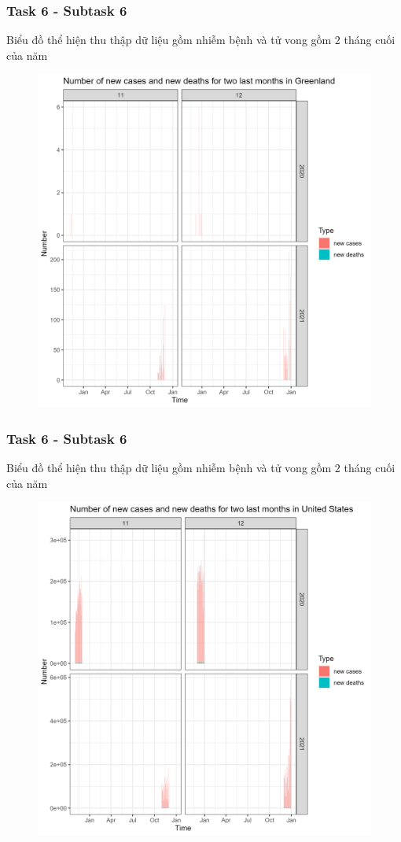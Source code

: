 \documentclass[english,10pt,table]{beamer}
\begin{document}
\frame
{
    \frametitle{Task 6 - Subtask 6}
    \begin{block}{Biểu đồ thể hiện thu thập dữ liệu gồm nhiễm bệnh và tử vong gồm 2 tháng cuối của năm}
    \begin{figure}[H]
		\centering
		\includegraphics[scale=0.105]{images/6.6.2.png}
	\end{figure}
    \end{block}
}
\frame
{
    \frametitle{Task 6 - Subtask 6}
    \begin{block}{Biểu đồ thể hiện thu thập dữ liệu gồm nhiễm bệnh và tử vong gồm 2 tháng cuối của năm}
    \begin{figure}[H]
		\centering
		\includegraphics[scale=0.105]{images/6.6.3.png}
	\end{figure}
    \end{block}
}
\end{document}
